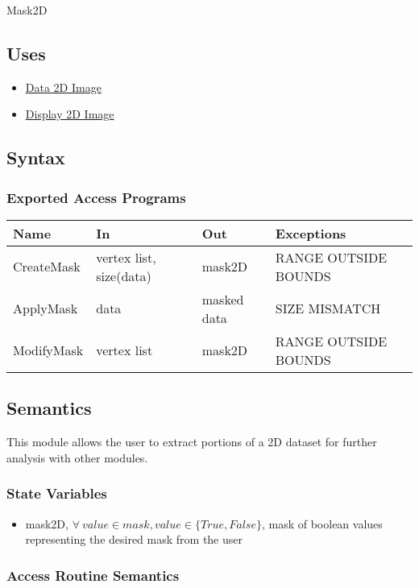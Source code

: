 \documentclass[12pt, titlepage]{article}
\begin{document}
Mask2D

\subsection{Uses}
\begin{itemize}
    \item \hyperref[Mod:Image]{Data 2D Image}
    \item \hyperref[Mod:Disp2D]{Display 2D Image}
\end{itemize}

\subsection{Syntax}

\subsubsection{Exported Access Programs}

\begin{center}
\begin{tabular}{p{3cm} p{4cm} p{4cm} p{3cm}}
\hline
\textbf{Name} & \textbf{In} & \textbf{Out} & \textbf{Exceptions} \\
\hline
CreateMask & vertex list, size(data) & mask2D & RANGE OUTSIDE BOUNDS \\
ApplyMask & data & masked data & SIZE MISMATCH\\
ModifyMask & vertex list & mask2D & RANGE OUTSIDE BOUNDS \\
\hline
\end{tabular}
\end{center}

\subsection{Semantics}
This module allows the user to extract portions of a 2D dataset for further analysis with other modules.

\subsubsection{State Variables}
\begin{itemize}
    \item mask2D, $\forall\ value \in mask, value \in \{True,False\}$, mask of boolean values representing the desired mask from the user
\end{itemize}

\subsubsection{Access Routine Semantics}
\end{document}
